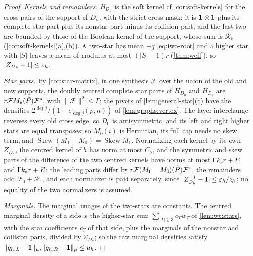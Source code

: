 \begin{proof}
\emph{Kernels and remainders.} $H_{D_h}$ is the soft kernel of
\cref{cor:soft-kernels} for the cross pairs of the support of $D_h$, with the
strict-cross mask: it is $\mathbf 1\otimes\mathbf 1$ plus its complete star part plus its
nonstar part minus its collision part, and the last two are bounded by those of
the Boolean kernel of the support, whose sum is $\mathcal R_h$
(\cref{cor:soft-kernels}(a),(b)). A two-star has mean $-q$ \eqref{eq:two-root}
and a higher star with $|S|$ leaves a mean of modulus at most $(|S|-1)r$
(\cref{thm:weil}), so $|Z_{D_h}-1|\le\varepsilon_h$.

\emph{Star parts.} By \cref{cor:star-matrix}, in one synthesis $\mathcal F$ over
the union of the old and new supports, the doubly centred complete star parts of
$H_{D_0}$ and $H_{D_1}$ are $r\mathcal FM_h(\hat P)\mathcal F^*$, with
$\|\mathcal F\|^2\le\Gamma$; the pivots of \cref{lem:general-star}(c) have the
densities $2^{\deg j}/(1-e_{\deg j}(p,n))$ of \cref{lem:graphs:vertex}. The layer
interchange reverses every old cross edge, so $D_0$ is antisymmetric, and its left
and right higher stars are equal transposes; so $M_0(i)$ is Hermitian, its full cap
needs no skew term, and $\operatorname{Skew}(M_1-M_0)=\operatorname{Skew}M_1$.
Normalizing each kernel by its own $Z_{D_h}$, the centred kernel of $h$ has norm at
most $C_h$, and the symmetric and skew parts of the difference of the two centred
kernels have norms at most $\Gamma k_{\rm s}r+E$ and $\Gamma k_{\rm a}r+E$: the
leading parts differ by $r\mathcal F(M_1-M_0)(\hat P)\mathcal F^*$, the remainders
add $\mathcal R_0+\mathcal R_1$, and each normalizer is paid separately, since
$|Z_{D_h}^{-1}-1|\le\varepsilon_h/z_h$; no equality of the two normalizers is assumed.

\emph{Marginals.} The marginal images of the two-stars are constants. The centred
marginal density of a side is the higher-star sum $\sum_{|T|\ge3}c_Tw_T$ of
\cref{lem:wt:stars}, with the star coefficients $c_T$ of that side, plus the
marginals of the nonstar and collision parts, divided by $Z_{D_h}$; so the raw
marginal densities satisfy $\|g_{h,L}-\mathbf 1\|_\mu,\|g_{h,R}-\mathbf 1\|_\mu\le u_h$.


\end{proof}
